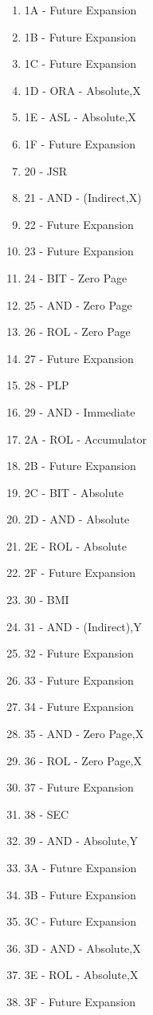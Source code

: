 \documentclass{article}
\begin{document}
\begin{multicols}{2}
\begin{enumerate}[label=\enumHex*,start=0]
    \item 1A - Future Expansion           
    \item 1B - Future Expansion           
    \item 1C - Future Expansion           
    \item 1D - ORA - Absolute,X           
    \item 1E - ASL - Absolute,X           
    \item 1F - Future Expansion           
    \item 20 - JSR
    \item 21 - AND - (Indirect,X)
    \item 22 - Future Expansion
    \item 23 - Future Expansion
    \item 24 - BIT - Zero Page
    \item 25 - AND - Zero Page
    \item 26 - ROL - Zero Page
    \item 27 - Future Expansion
    \item 28 - PLP
    \item 29 - AND - Immediate
    \item 2A - ROL - Accumulator
    \item 2B - Future Expansion
    \item 2C - BIT - Absolute
    \item 2D - AND - Absolute
    \item 2E - ROL - Absolute
    \item 2F - Future Expansion
    \item 30 - BMI
    \item 31 - AND - (Indirect),Y
    \item 32 - Future Expansion
    \item 33 - Future Expansion
    \item 34 - Future Expansion
    \item 35 - AND - Zero Page,X
    \item 36 - ROL - Zero Page,X
    \item 37 - Future Expansion
    \item 38 - SEC
    \item 39 - AND - Absolute,Y
    \item 3A - Future Expansion
    \item 3B - Future Expansion
    \item 3C - Future Expansion
    \item 3D - AND - Absolute,X
    \item 3E - ROL - Absolute,X
    \item 3F - Future Expansion


\end{enumerate}
\end{multicols}
\end{document}
